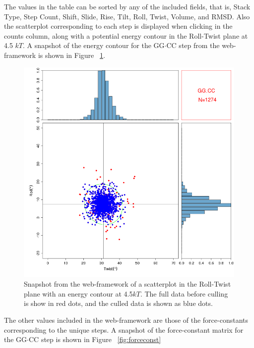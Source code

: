 The values in  the table can be sorted by any  of the included fields,
that  is, Stack  Type, Step  Count,  Shift, Slide,  Rise, Tilt,  Roll,
Twist, Volume,  and RMSD. Also  the scatterplot corresponding  to each
step is  displayed when  clicking in the  counts column, along  with a
potential  energy contour  in  the  Roll-Twist plane  at  4.5 $kT$.  A
snapshot  of the  energy contour  for  the GG$\cdot$CC  step from  the
web-framework is shown in Figure ~\ref{fig:contour}.
\begin{figure}[htbp]
\centering
\includegraphics[angle=0, scale=0.58]{Chapter4/contour.png}
\caption{Snapshot from the web-framework of a scatterplot in the
  Roll-Twist plane with an energy contour at 4.5$kT$. The full data before
  culling is show in red dots, and the culled data is shown as blue dots.} 
\label{fig:contour}
\end{figure}

The  other values  included  in  the web-framework  are  those of  the
force-constants corresponding  to the unique steps. A  snapshot of the
force-constant  matrix for  the GG$\cdot$CC  step is  shown  in Figure
~\ref{fig:forceconst}

